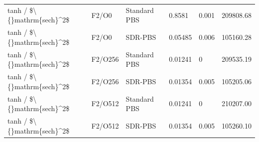 \begin{tabular}{llllll}
tanh / \$\textbackslash\{\}mathrm\{sech\}^2\$ & F2/O0 & Standard PBS & 0.8581 & 0.001 & 209808.68 \\
tanh / \$\textbackslash\{\}mathrm\{sech\}^2\$ & F2/O0 & SDR-PBS & 0.05485 & 0.006 & 105160.28 \\
tanh / \$\textbackslash\{\}mathrm\{sech\}^2\$ & F2/O256 & Standard PBS & 0.01241 & 0 & 209535.19 \\
tanh / \$\textbackslash\{\}mathrm\{sech\}^2\$ & F2/O256 & SDR-PBS & 0.01354 & 0.005 & 105205.06 \\
tanh / \$\textbackslash\{\}mathrm\{sech\}^2\$ & F2/O512 & Standard PBS & 0.01241 & 0 & 210207.00 \\
tanh / \$\textbackslash\{\}mathrm\{sech\}^2\$ & F2/O512 & SDR-PBS & 0.01354 & 0.005 & 105260.10 \\
\bottomrule
\end{tabular}
